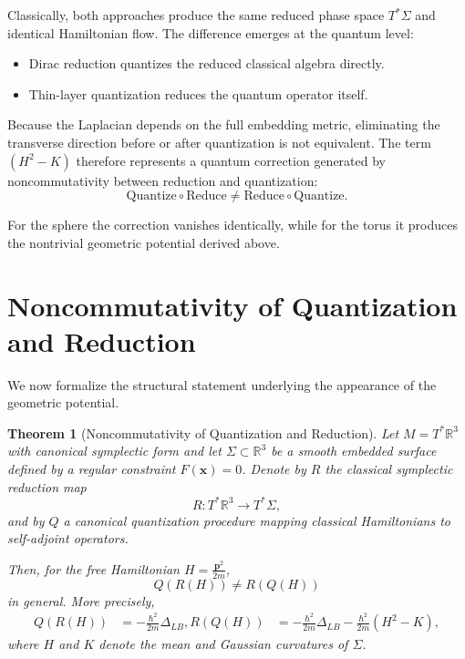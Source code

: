 \documentclass[11pt]{article}
\newtheorem{theorem}{Theorem}
\begin{document}
Classically, both approaches produce the same reduced phase space $T^*\Sigma$ and identical Hamiltonian flow. The difference emerges at the quantum level:

\begin{itemize}
\item Dirac reduction quantizes the reduced classical algebra directly.
\item Thin-layer quantization reduces the quantum operator itself.
\end{itemize}

Because the Laplacian depends on the full embedding metric, eliminating the transverse direction before or after quantization is not equivalent. The term $(H^2-K)$ therefore represents a quantum correction generated by noncommutativity between reduction and quantization:
\begin{equation}
\text{Quantize}\circ\text{Reduce} \neq \text{Reduce}\circ\text{Quantize}.
\end{equation}

For the sphere the correction vanishes identically, while for the torus it produces the nontrivial geometric potential derived above.

\section{Noncommutativity of Quantization and Reduction}

We now formalize the structural statement underlying the appearance of the geometric potential.

\begin{theorem}[Noncommutativity of Quantization and Reduction]
Let $M = T^*\mathbb{R}^3$ with canonical symplectic form and let $\Sigma \subset \mathbb{R}^3$ be a smooth embedded surface defined by a regular constraint $F(\mathbf{x})=0$. Denote by $R$ the classical symplectic reduction map
\begin{equation}
R: T^*\mathbb{R}^3 \longrightarrow T^*\Sigma,
\end{equation}
and by $Q$ a canonical quantization procedure mapping classical Hamiltonians to self-adjoint operators.

Then, for the free Hamiltonian $H = \frac{\mathbf{p}^2}{2m}$,
\begin{equation}
Q(R(H)) \neq R(Q(H))
\end{equation}
in general. More precisely,
\begin{align}
Q(R(H)) &= -\frac{\hbar^2}{2m}\Delta_{LB}, 
R(Q(H)) &= -\frac{\hbar^2}{2m}\Delta_{LB} - \frac{\hbar^2}{2m}(H^2-K),
\end{align}
where $H$ and $K$ denote the mean and Gaussian curvatures of $\Sigma$.
\end{theorem}
\end{document}
